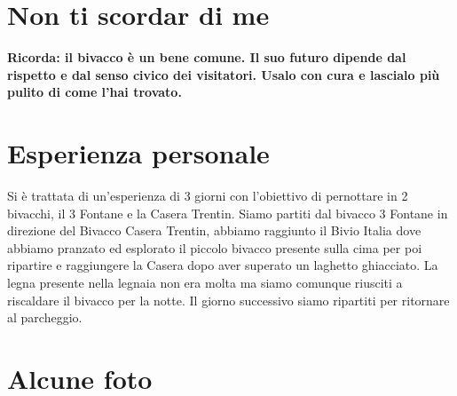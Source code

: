 \documentclass{article}
\begin{document}
\section{Non ti scordar di me}
\textbf{\textcolor{BurntOrange}{Ricorda: il bivacco è un bene comune. Il suo futuro dipende dal rispetto e dal senso civico dei visitatori. Usalo con cura e lascialo più pulito di come l'hai trovato.}}


\section{Esperienza personale}
Si è trattata di un'esperienza di 3 giorni con l'obiettivo di pernottare in 2 bivacchi, il 3 Fontane e la Casera Trentin. 
Siamo partiti dal bivacco 3 Fontane in direzione del Bivacco Casera Trentin, abbiamo raggiunto il Bivio Italia dove abbiamo pranzato ed esplorato il piccolo bivacco presente sulla cima per poi ripartire e raggiungere la Casera dopo aver superato un laghetto ghiacciato. La legna presente nella legnaia non era molta ma siamo comunque riusciti a riscaldare il bivacco per la notte. Il giorno successivo siamo ripartiti per ritornare al parcheggio. 


\section{Alcune foto}

\end{document}
